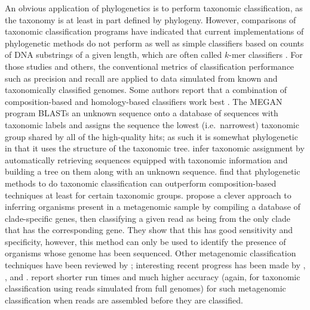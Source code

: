 \documentclass{amsart}
\begin{document}
An obvious application of phylogenetics is to perform taxonomic classification, as the taxonomy is at least in part defined by phylogeny.
However, comparisons of taxonomic classification programs \citep{liu2008accurate,bazinet2012comparative} have indicated that current implementations of phylogenetic methods do not perform as well as simple classifiers based on counts of DNA substrings of a given length, which are often called $k$-mer classifiers \citep{wang2007naive,rosen2008metagenome}.
For those studies and others, the conventional metrics of classification performance such as precision and recall are applied to data simulated from known and taxonomically classified genomes.
Some authors report that a combination of composition-based and homology-based classifiers work best \citep{brady2009phymm,parks2011classifying}.
The MEGAN program \citep{huson2007megan,huson2011integrative} BLASTs an unknown sequence onto a database of sequences with taxonomic labels and assigns the sequence the lowest (i.e.\ narrowest) taxonomic group shared by all of the high-quality hits; as such it is somewhat phylogenetic in that it uses the structure of the taxonomic tree.
\citet{munch2008fast,munch2008statistical} infer taxonomic assignment by automatically retrieving sequences equipped with taxonomic information and building a tree on them along with an unknown sequence.
\citet{srinivasan2012bacterial} find that phylogenetic methods to do taxonomic classification can outperform composition-based techniques at least for certain taxonomic groups.
\citet{segata2012metagenomic} propose a clever approach to inferring organisms present in a metagenomic sample by compiling a database of clade-specific genes, then classifying a given read as being from the only clade that has the corresponding gene.
They show that this has good sensitivity and specificity, however, this method can only be used to identify the presence of organisms whose genome has been sequenced.
Other metagenomic classification techniques have been reviewed by \citet{mande2012classification}; interesting recent progress has been made by \citet{Lanzen2012-ul}, \citet{Koslicki2013-mc}, and \citet{Droge2014-lj}.
\citet{treangen2013metamos} report shorter run times and much higher accuracy (again, for taxonomic classification using reads simulated from full genomes) for such metagenomic classification when reads are assembled before they are classified.
\end{document}
